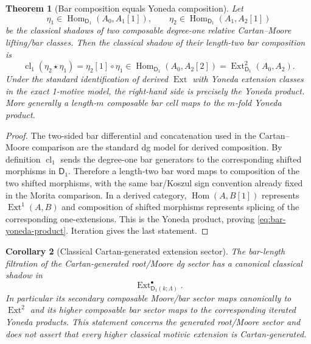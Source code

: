 \documentclass[11pt]{article}
\newtheorem{theorem}{Theorem}[section]
\newtheorem{corollary}[theorem]{Corollary}
\theoremstyle{remark}
\begin{document}
\begin{theorem}[Bar composition equals Yoneda composition]
\label{thm:bar-yoneda-comparison}
Let
\[
 \eta_1\in
 \operatorname{Hom}_{\mathsf D_1}(A_0,A_1[1]),
 \qquad
 \eta_2\in
 \operatorname{Hom}_{\mathsf D_1}(A_1,A_2[1])
\]
be the classical shadows of two composable degree-one relative Cartan--Moore lifting/bar
classes.  Then the classical shadow of their length-two bar composition is
\begin{equation}\label{eq:bar-yoneda-product}
 \boxed{
 \operatorname{cl}_1(\eta_2\star\eta_1)
 =\eta_2[1]\circ\eta_1
 \in
 \operatorname{Hom}_{\mathsf D_1}(A_0,A_2[2])
 =\operatorname{Ext}^2_{\mathsf D_1}(A_0,A_2).}
\end{equation}
Under the standard identification of derived $\operatorname{Ext}$ with Yoneda extension
classes in the exact 1-motive model, the right-hand side is precisely the Yoneda product.
More generally a length-$m$ composable bar cell maps to the $m$-fold Yoneda product.
\end{theorem}

\begin{proof}
The two-sided bar differential and concatenation used in the Cartan--Moore comparison are
the standard dg model for derived composition.  By definition
$\operatorname{cl}_1$ sends the degree-one bar generators to the corresponding shifted
morphisms in $\mathsf D_1$.  Therefore a length-two bar word maps to composition of the
two shifted morphisms, with the same bar/Koszul sign convention already fixed in the
Morita comparison.  In a derived category,
$\operatorname{Hom}(A,B[1])$ represents $\operatorname{Ext}^1(A,B)$ and composition of
shifted morphisms represents splicing of the corresponding one-extensions.  This is the
Yoneda product, proving \eqref{eq:bar-yoneda-product}.  Iteration gives the last
statement.
\end{proof}

\begin{corollary}[Classical Cartan-generated extension sector]
\label{cor:classical-cartan-generated-extension-sector}
The bar-length filtration of the Cartan-generated root/Moore dg sector has a canonical
classical shadow in
\[
 \operatorname{Ext}^{\bullet}_{\mathsf D_1(k;\Lambda)}.
\]
In particular its secondary composable Moore/bar sector maps canonically to
$\operatorname{Ext}^2$ and its higher composable bar sector maps to the corresponding
iterated Yoneda products.  This statement concerns the generated root/Moore sector and
does not assert that every higher classical motivic extension is Cartan-generated.
\end{corollary}
\end{document}
